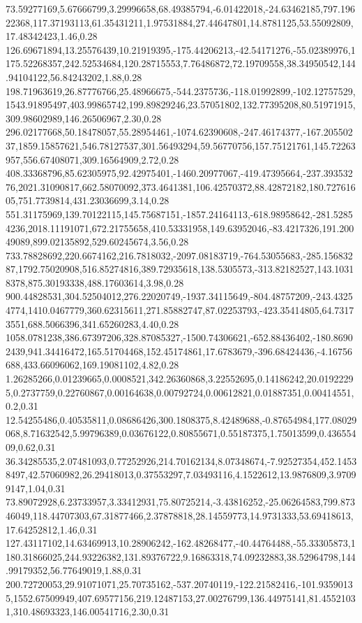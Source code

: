 73.59277169,5.67666799,3.29996658,68.49385794,-6.01422018,-24.63462185,797.19622368,117.37193113,61.35431211,1.97531884,27.44647801,14.8781125,53.55092809,17.48342423,1.46,0.28
126.69671894,13.25576439,10.21919395,-175.44206213,-42.54171276,-55.02389976,1175.52268357,242.52534684,120.28715553,7.76486872,72.19709558,38.34950542,144.94104122,56.84243202,1.88,0.28
198.71963619,26.87776766,25.48966675,-544.2375736,-118.01992899,-102.12757529,1543.91895497,403.99865742,199.89829246,23.57051802,132.77395208,80.51971915,309.98602989,146.26506967,2.30,0.28
296.02177668,50.18478057,55.28954461,-1074.62390608,-247.46174377,-167.20550237,1859.15857621,546.78127537,301.56493294,59.56770756,157.75121761,145.72263957,556.67408071,309.16564909,2.72,0.28
408.33368796,85.62305975,92.42975401,-1460.20977067,-419.47395664,-237.39353276,2021.31090817,662.58070092,373.4641381,106.42570372,88.42872182,180.72761605,751.7739814,431.23036699,3.14,0.28
551.31175969,139.70122115,145.75687151,-1857.24164113,-618.98958642,-281.52854236,2018.11191071,672.21755658,410.53331958,149.63952046,-83.4217326,191.20049089,899.02135892,529.60245674,3.56,0.28
733.78828692,220.6674162,216.7818032,-2097.08183719,-764.53055683,-285.15683287,1792.75020908,516.85274816,389.72935618,138.5305573,-313.82182527,143.10318378,875.30193338,488.17603614,3.98,0.28
900.44828531,304.52504012,276.22020749,-1937.34115649,-804.48757209,-243.43254774,1410.0467779,360.62315611,271.85882747,87.02253793,-423.35414805,64.73173551,688.5066396,341.65260283,4.40,0.28
1058.0781238,386.67397206,328.87085327,-1500.74306621,-652.88436402,-180.86902439,941.34416472,165.51704468,152.45174861,17.6783679,-396.68424436,-4.16756688,433.66096062,169.19081102,4.82,0.28
1.26285266,0.01239665,0.0008521,342.26360868,3.22552695,0.14186242,20.01922295,0.2737759,0.22760867,0.00164638,0.00792724,0.00612821,0.01887351,0.00414551,0.2,0.31
12.54255486,0.40535811,0.08686426,300.1808375,8.42489688,-0.87654984,177.08029068,8.71632542,5.99796389,0.03676122,0.80855671,0.55187375,1.75013599,0.43655409,0.62,0.31
36.34285535,2.07481093,0.77252926,214.70162134,8.07348674,-7.92527354,452.14538497,42.57060982,26.29418013,0.37553297,7.03493116,4.1522612,13.9876809,3.97099147,1.04,0.31
73.89072928,6.23733957,3.33412931,75.80725214,-3.43816252,-25.06264583,799.87346049,118.44707303,67.31877466,2.37878818,28.14559773,14.9731333,53.69418613,17.64252812,1.46,0.31
127.43117102,14.63469913,10.28906242,-162.48268477,-40.44764488,-55.33305873,1180.31866025,244.93226382,131.89376722,9.16863318,74.09232883,38.52964798,144.99179352,56.77649019,1.88,0.31
200.72720053,29.91071071,25.70735162,-537.20740119,-122.21582416,-101.93590135,1552.67509949,407.69577156,219.12487153,27.00276799,136.44975141,81.45521031,310.48693323,146.00541716,2.30,0.31
